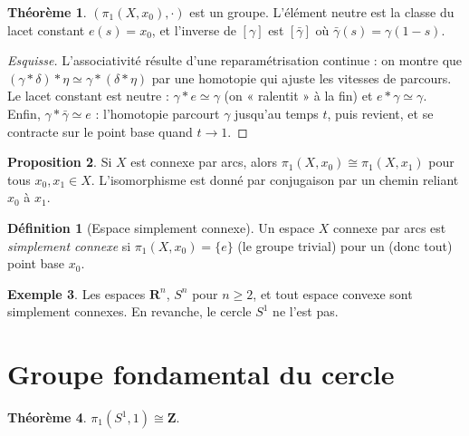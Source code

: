 \documentclass[12pt,a4paper,openany]{book}
\theoremstyle{definition}
\newtheorem{definition}{Définition}[chapter]
\theoremstyle{cours}
\newtheorem{theoreme}{Théorème}[chapter]
\newtheorem{proposition}[theoreme]{Proposition}
\theoremstyle{coursnormal}
\newtheorem{exemple}[theoreme]{Exemple}
\begin{document}
\begin{theoreme}
\label{thm:pi1-groupe}
$(\pi_1(X,x_0),\cdot)$ est un groupe. L'élément neutre est la classe
du lacet constant $e(s)=x_0$, et l'inverse de $[\gamma]$ est
$[\bar{\gamma}]$ où $\bar{\gamma}(s)=\gamma(1-s)$.
\end{theoreme}

\begin{proof}[Esquisse]
L'associativité résulte d'une reparamétrisation continue : on montre
que $(\gamma*\delta)*\eta\simeq\gamma*(\delta*\eta)$ par une
homotopie qui ajuste les vitesses de parcours.
Le lacet constant est neutre : $\gamma*e\simeq\gamma$ (on « ralentit »
à la fin) et $e*\gamma\simeq\gamma$. Enfin,
$\gamma*\bar{\gamma}\simeq e$ : l'homotopie parcourt $\gamma$ jusqu'au
temps $t$, puis revient, et se contracte sur le point base quand $t\to 1$.
\end{proof}

\begin{proposition}
\label{prop:pi1-changement-base}
Si $X$ est connexe par arcs, alors $\pi_1(X,x_0)\cong\pi_1(X,x_1)$
pour tous $x_0,x_1\in X$. L'isomorphisme est donné par conjugaison
par un chemin reliant $x_0$ à $x_1$.
\end{proposition}

\begin{definition}[Espace simplement connexe]
\label{def:simplement-connexe}
Un espace $X$ connexe par arcs est \emph{simplement connexe} si
$\pi_1(X,x_0)=\{e\}$ (le groupe trivial) pour un (donc tout) point
base $x_0$.
\end{definition}

\begin{exemple}
\label{ex:simplement-connexes}
Les espaces $\mathbf{R}^n$, $S^n$ pour $n\ge 2$, et tout espace
convexe sont simplement connexes. En revanche, le cercle $S^1$ ne
l'est pas.
\end{exemple}

\section{Groupe fondamental du cercle}
\label{sec:pi1-cercle}

\begin{theoreme}
\label{thm:pi1-S1}
$\pi_1(S^1, 1)\cong\mathbf{Z}$.
\end{theoreme}
\end{document}
